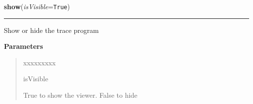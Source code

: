\hspace{.8\funcindent}\begin{boxedminipage}{\funcwidth}

    \raggedright \textbf{show}(\textit{isVisible}={\tt True})

    \vspace{-1.5ex}

    \rule{\textwidth}{0.5\fboxrule}
\setlength{\parskip}{2ex}
    Show or hide the trace program

\setlength{\parskip}{1ex}
      \textbf{Parameters}
      \vspace{-1ex}

      \begin{quote}
        \begin{Ventry}{xxxxxxxxx}

          \item[isVisible]

          True to show the viewer. False to hide

        \end{Ventry}

      \end{quote}

    \end{boxedminipage}

    \label{tracetool:TTrace:find}

    \vspace{0.5ex}

